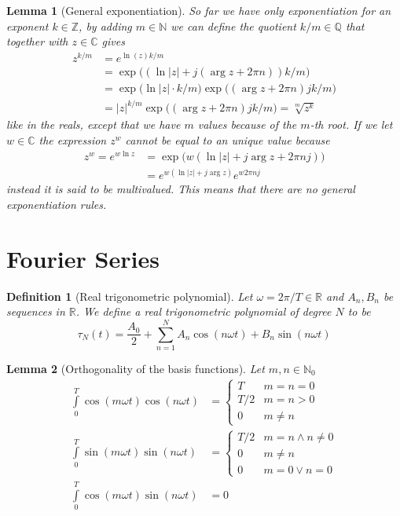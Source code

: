 \documentclass[twocolumn, margin=small]{tex/hsrzf}
\newcommand\Nset{\mathbb{N}}
\newcommand\Zset{\mathbb{Z}}
\newcommand\Qset{\mathbb{Q}}
\newcommand\Rset{\mathbb{R}}
\newcommand\Cset{\mathbb{C}}
\newcommand\len[1]{\lvert#1\rvert}
\theoremstyle{komfourzf}
\newtheorem{definition}{Definition}
\newtheorem{lemma}{Lemma}
\begin{document}
\begin{lemma}[General exponentiation]
  So far we have only exponentiation for an exponent \(k\in\Zset\), by adding \(m \in\Nset\) we can define the quotient \(k/m \in\Qset\) that together with \(z\in\Cset\) gives
  \begin{align*}
    z^{k/m} &= e^{\ln(z) k/m} \\
    &= \exp\big((\ln\len{z} + j(\arg z + 2\pi n)) k/m\big) \\
    &= \exp\big(\ln\len{z}\cdot k/m)\exp((\arg z + 2\pi n)jk/m\big) \\
    &= \len{z}^{k/m}\exp\big((\arg z + 2\pi n)jk/m\big)= \sqrt[m]{z^k}
  \end{align*}
  like in the reals, except that we have \(m\) values because of the \(m\)-th root. If we let \(w \in\Cset\) the expression \(z^w\) cannot be equal to an unique value because
  \begin{align*}
    z^w = e^{w \ln z} &= \exp\big( w (\ln\len{z} + j \arg{z} + 2\pi nj)\big) \\
    &= e^{w(\ln\len{z} + j\arg z)} e^{w2\pi nj}
  \end{align*}
  instead it is said to be \emph{multivalued}. This means that there are no general exponentiation rules.
\end{lemma}

\section{Fourier Series}
\begin{definition}[Real trigonometric polynomial]
  Let \(\omega = 2\pi/T \in\Rset\) and \(A_n, B_n\) be sequences in \(\Rset\).
  We define a \emph{real trigonometric polynomial} of degree \(N\) to be
  \[
    \tau_N(t) = \frac{A_0}{2} + \sum_{n=1}^N A_n \cos(n\omega t) + B_n \sin(n\omega t)
  \]
\end{definition}

\begin{lemma}[Orthogonality of the basis functions]
  Let \(m,n \in\Nset_0\)
  \begin{align*}
    \int\limits_0^T \cos(m\omega t)\cos(n\omega t)
    &= \begin{cases}
        T & m = n = 0 \\
        T/2 & m = n > 0 \\
        0 & m \neq n
      \end{cases} \\
    \int\limits_0^T \sin(m\omega t)\sin(n\omega t)
    &= \begin{cases}
        T/2 & m = n \wedge n \neq 0 \\
        0 & m \neq n \\
        0 & m = 0 \vee n = 0
      \end{cases} \\
    \int\limits_0^T \cos(m\omega t)\sin(n\omega t) &= 0
  \end{align*}
\end{lemma}
\end{document}
